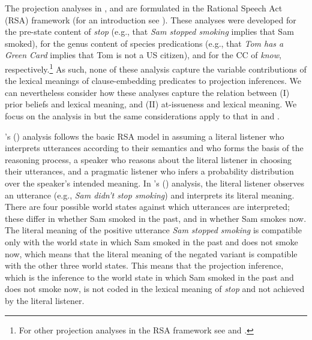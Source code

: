 \documentclass[11pt,fleqn]{article}
\newcommand{\6}{\mbox{$[\hspace*{-.6mm}[$}}
\newcommand{\9}{\mbox{$]\hspace*{-.6mm}]$}}
\newcommand{\citetpos}[1]{\citeauthor{#1}'s (\citeyear{#1})}
\begin{document}
The projection analyses in \cite{qing-etal2016}, \cite{warstadt2022} and \cite{scontras-tonhauser2025} are formulated in the Rational Speech Act (RSA) framework (for an introduction see \citealt{degen2023-RSA}).  These analyses were developed for the pre-state content of {\em stop} (e.g., that {\em Sam stopped smoking} implies that Sam smoked), for the genus content of species predications (e.g., that {\em Tom has a Green Card} implies that Tom is not a US citizen), and for the CC of \emph{know}, respectively.\footnote{For other projection analyses in the RSA framework see \cite{stevens-etal2017} and \cite{pan-degen2023}.} As such, none of these analysis capture the variable contributions of the lexical meanings of clause-embedding predicates to projection inferences. We can nevertheless consider how these analyses capture the relation between (I) prior beliefs and lexical meaning, and (II) at-issueness and lexical meaning. We focus on the analysis in \cite{qing-etal2016} but the same considerations apply to that in \cite{warstadt2022} and \citealt{scontras-tonhauser2025}.

\citetpos{qing-etal2016} analysis follows the basic RSA model in assuming a literal listener who interprets utterances according to their semantics and who forms the basis of the reasoning process, a speaker who reasons about the literal listener in choosing their utterances, and a pragmatic listener who infers a probability distribution over the speaker's intended meaning.  In \citetpos{qing-etal2016} analysis, the literal listener observes an utterance (e.g., {\em Sam didn't stop smoking}) and interprets its literal meaning. There are four possible world states against which utterances are interpreted; these differ in whether Sam smoked in the past, and in whether Sam smokes now. The literal meaning of the positive utterance {\em Sam stopped smoking} is compatible only with the world state in which Sam smoked in the past and does not smoke now, which means that the literal meaning of the negated variant is compatible with the other three world states. This means that the projection inference, which is the inference to the world state in which Sam smoked in the past and does not smoke now, is not coded in the lexical meaning of {\em stop} and not achieved by the literal listener.
\end{document}
